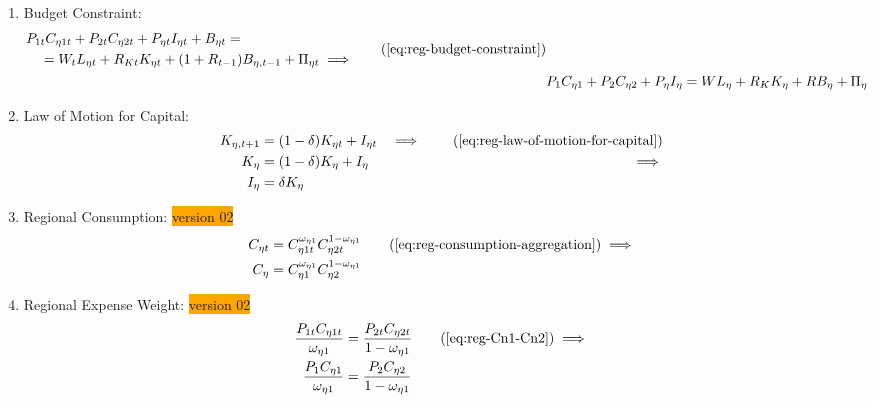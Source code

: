 \documentclass[../thesis.tex]{subfiles}
\begin{document}
\begin{enumerate}

	\item Budget Constraint: 
	\begin{align}
	\begin{split}
		& P_{1 t} C_{\eta 1 t} + P_{2 t} C_{\eta 2 t} + P_{\eta t} I_{\eta t} + B_{\eta t} = \\ & \quad = W_t L_{\eta t} + R_{Kt} K_{\eta t} + (1 + R_{t-1}) B_{\eta,t-1} + \Pi_{\eta t} \implies
	\end{split} \tag{\ref{eq:reg-budget-constraint}}
	\\
	& P_{1} C_{\eta 1} + P_{2} C_{\eta 2} + P_{\eta} I_{\eta} = W L_{\eta} + R_{K} K_{\eta} + R B_{\eta} + \Pi_{\eta} \label{eq:reg-ss-budget-constraint}
	\end{align}

	\item Law of Motion for Capital:
	\begin{alignat}{2}
		K_{\eta, t+1} &= (1-\delta)K_{\eta t} + I_{\eta t} &\implies \tag{\ref{eq:reg-law-of-motion-for-capital}} \\
		K_{\eta} &= (1-\delta)K_{\eta} + I_{\eta} &\implies \nonumber \\
		I_{\eta} &= \delta K_{\eta} \label{eq:reg-ss-law-of-motion-for-capital}
	\end{alignat}

	\item Regional Consumption: \colorbox{orange}{version 02}
	\begin{align}
		C_{\eta t} &= C_{\eta 1 t}^{\omega_{\eta 1}} C_{\eta 2 t}^{1-\omega_{\eta 1}} \tag{\ref{eq:reg-consumption-aggregation}} \implies \\
		C_{\eta} &= C_{\eta 1}^{\omega_{\eta 1}} C_{\eta 2}^{1-\omega_{\eta 1}} \label{eq:reg-ss-consumption-aggregation}
	\end{align}
	
	\item Regional Expense Weight: \colorbox{orange}{version 02}
	\begin{align}
		\frac{P_{1 t} C_{\eta 1 t}}{\omega_{\eta 1}} &= \frac{P_{2 t} C_{\eta 2 t}}{1 -\omega_{\eta 1}} \tag{\ref{eq:reg-Cn1-Cn2}} \implies \\
		\frac{P_{1} C_{\eta 1}}{\omega_{\eta 1}} &= \frac{P_{2} C_{\eta 2}}{1 -\omega_{\eta 1}} \label{eq:reg-ss-Cn1-Cn2}
	\end{align}

\begin{comment}


\end{comment}
\end{enumerate}
\end{document}
